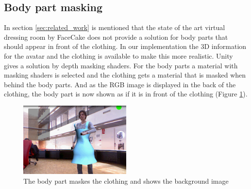 \documentclass[twocolumn,a4paper]{article}
\begin{document}
\subsection{Body part masking}
\label{sec:bodypart_masking}
In section \ref{sec:related_work} is mentioned that the state of the art virtual dressing room by FaceCake does not provide a solution for body parts that should appear in front of the clothing. In our implementation the 3D information for the avatar and the clothing is available to make this more realistic. Unity gives a solution by depth masking shaders. For the body parts a material with masking shaders is selected and the clothing gets a material that is masked when behind the body parts. And as the RGB image is displayed in the back of the clothing, the body part is now shown as if it is in front of the clothing (Figure \ref{fig:shader}).

 \begin{figure}[htp]
\centering
\includegraphics[width=0.5\textwidth]{show_shader_morris.png} 
\caption{The body part maskes the clothing and shows the background image}
\label{fig:shader}
\end{figure}
\end{document}
